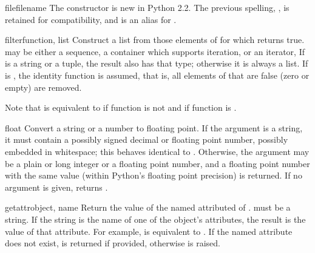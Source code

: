 \begin{funcdesc}{file}{filename}
  The  constructor is new in Python 2.2.  The previous
  spelling, , is retained for compatibility, and is an
  alias for .
\end{funcdesc}

\begin{funcdesc}{filter}{function, list}
  Construct a list from those elements of  for which
   returns true.   may be either a sequence, a
  container which supports iteration, or an iterator,  If 
  is a string or a tuple, the result also has that type; otherwise it
  is always a list.  If  is , the identity
  function is assumed, that is, all elements of  that are false
  (zero or empty) are removed.

  Note that  is equivalent to
   if function is
  not  and  if
  function is .
\end{funcdesc}

\begin{funcdesc}{float}{}
  Convert a string or a number to floating point.  If the argument is a
  string, it must contain a possibly signed decimal or floating point
  number, possibly embedded in whitespace; this behaves identical to
  .  Otherwise, the argument may be a plain
  or long integer or a floating point number, and a floating point
  number with the same value (within Python's floating point
  precision) is returned.  If no argument is given, returns .

\end{funcdesc}

\begin{funcdesc}{getattr}{object, name}
  Return the value of the named attributed of .  
  must be a string.  If the string is the name of one of the object's
  attributes, the result is the value of that attribute.  For example,
   is equivalent to .  If the
  named attribute does not exist,  is returned if provided,
  otherwise  is raised.
\end{funcdesc}

